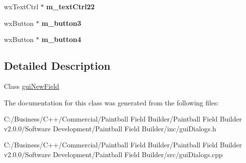 \begin{DoxyCompactItemize}
\item 
\hypertarget{classgui_new_field_ae5bfc7c8fcffe0eb81725bfd59aa641b}{
wxTextCtrl $\ast$ {\bfseries m\_\-textCtrl22}}
\label{classgui_new_field_ae5bfc7c8fcffe0eb81725bfd59aa641b}

\item 
\hypertarget{classgui_new_field_a2c464a520b63359af57179e6e8a7748d}{
wxButton $\ast$ {\bfseries m\_\-button3}}
\label{classgui_new_field_a2c464a520b63359af57179e6e8a7748d}

\item 
\hypertarget{classgui_new_field_a8926e2d13f66bdcf3052360124a8566a}{
wxButton $\ast$ {\bfseries m\_\-button4}}
\label{classgui_new_field_a8926e2d13f66bdcf3052360124a8566a}

\end{DoxyCompactItemize}


\subsection{Detailed Description}
Class \hyperlink{classgui_new_field}{guiNewField} 

The documentation for this class was generated from the following files:\begin{DoxyCompactItemize}
\item 
C:/Business/C++/Commercial/Paintball Field Builder/Paintball Field Builder v2.0.0/Software Development/Paintball Field Builder/inc/guiDialogs.h\item 
C:/Business/C++/Commercial/Paintball Field Builder/Paintball Field Builder v2.0.0/Software Development/Paintball Field Builder/src/guiDialogs.cpp\end{DoxyCompactItemize}
